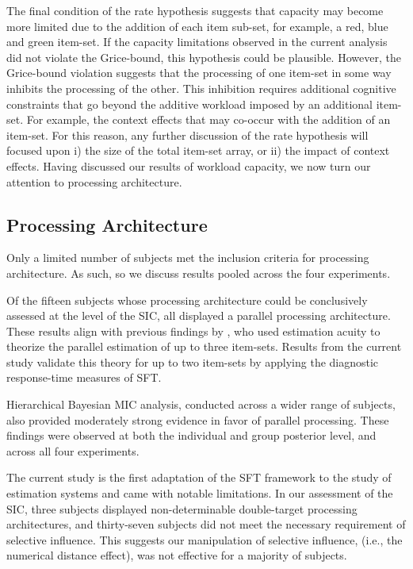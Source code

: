 The final condition of the rate hypothesis suggests that capacity may become more limited due to the addition of each item sub-set, for example, a red, blue and green item-set. If the capacity limitations observed in the current analysis did not violate the Grice-bound, this hypothesis could be plausible. However, the Grice-bound violation suggests that the processing of one item-set in some way inhibits the processing of the other. This inhibition requires additional cognitive constraints that go beyond the additive workload imposed by an additional item-set. For example, the context effects that may co-occur with the addition of an item-set. For this reason, any further discussion of the rate hypothesis will focused upon i) the size of the total item-set array, or ii) the impact of context effects. Having discussed our results of workload capacity, we now turn our attention to processing architecture.

\subsection{Processing Architecture}
Only a limited number of subjects met the inclusion criteria for processing architecture. As such, so we discuss results pooled across the four experiments. 

Of the fifteen subjects whose processing architecture could be conclusively assessed at the level of the SIC, all displayed a parallel processing architecture. These results align with previous findings by , who used estimation acuity to theorize the parallel estimation of up to three item-sets. Results from the current study validate this theory for up to two item-sets by applying the diagnostic response-time measures of SFT.

Hierarchical Bayesian MIC analysis, conducted across a wider range of subjects, also provided moderately strong evidence in favor of parallel processing. These findings were observed at both the individual and group posterior level, and across all four experiments.

The current study is the first adaptation of the SFT framework to the study of estimation systems and came with notable limitations. In our assessment of the SIC, three subjects displayed non-determinable double-target processing architectures, and thirty-seven subjects did not meet the necessary requirement of selective influence. This suggests our manipulation of selective influence, (i.e., the numerical distance effect), was not effective for a majority of subjects. 

